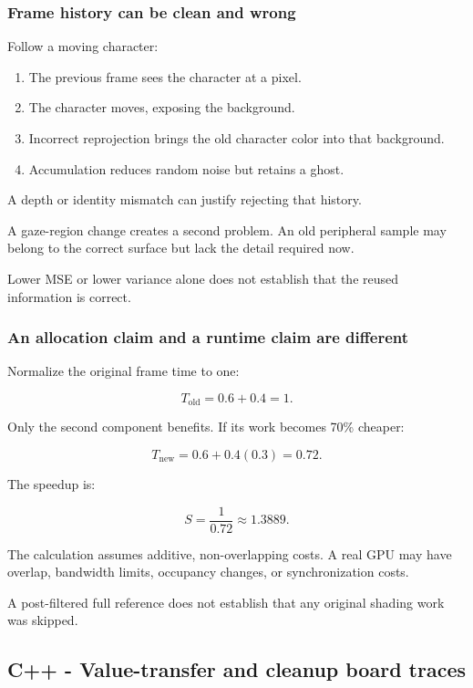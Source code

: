 \subsubsection{Frame history can be clean and wrong}\label{appendix-92ff77d4dfdc-frame-history-can-be-clean-and-wrong}

Follow a moving character:

\begin{enumerate}
\def\labelenumi{\arabic{enumi}.}
\tightlist
\item
  The previous frame sees the character at a pixel.
\item
  The character moves, exposing the background.
\item
  Incorrect reprojection brings the old character color into that background.
\item
  Accumulation reduces random noise but retains a ghost.
\end{enumerate}

A depth or identity mismatch can justify rejecting that history.

A gaze-region change creates a second problem. An old peripheral sample may belong to the correct surface but lack the detail required now.

Lower MSE or lower variance alone does not establish that the reused information is correct.

\subsubsection{An allocation claim and a runtime claim are different}\label{appendix-92ff77d4dfdc-an-allocation-claim-and-a-runtime-claim-are-different}

Normalize the original frame time to one:

\[
T_{\mathrm{old}}=0.6+0.4=1.
\]

Only the second component benefits. If its work becomes 70\% cheaper:

\[
T_{\mathrm{new}}=0.6+0.4(0.3)=0.72.
\]

The speedup is:

\[
S=\frac1{0.72}\approx1.3889.
\]

The calculation assumes additive, non-overlapping costs. A real GPU may have overlap, bandwidth limits, occupancy changes, or synchronization costs.

A post-filtered full reference does not establish that any original shading work was skipped.

\subsection{C++ - Value-transfer and cleanup board traces}\label{appendix-92ff77d4dfdc-c---value-transfer-and-cleanup-board-traces}

